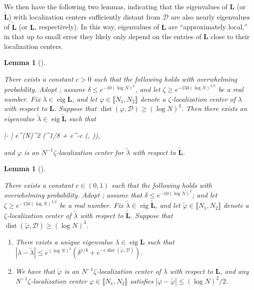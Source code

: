 \documentclass{amsart}
\numberwithin{equation}{section}
\DeclareMathOperator{\eig}{eig}
\DeclareMathOperator{\dist}{dist}
\newtheorem{lem}[thm]{Lemma}
\theoremstyle{remark}
\theoremstyle{definition}
\begin{document}
	We then have the following two lemmas, indicating that the eigenvalues of $\bm{L}$ (or $\tilde{\bm{L}}$) with localization centers sufficiently distant from $\mathcal{D}$ are also nearly eigenvalues of $\tilde{\bm{L}}$ (or $\bm{L}$, respectively). In this way, eigenvalues of $\bm{L}$ are ``approximately local,'' in that up to small error they likely only depend on the entries of $\bm{L}$ close to their localization centers.
	
	
	\begin{lem}[{\cite[Corollary 5.5]{LC}}]
		
		\label{lleigenvalues2} 
		
		
		There exists a constant $c>0$ such that the following holds with overwhelming probability. Adopt ; assume $\delta \le e^{-10(\log N)^2}$, and let $\zeta \ge e^{-150(\log N)^{3/2}}$ be a real number. Fix $\lambda \in \eig \bm{L}$, and let $\varphi \in \llbracket N_1, N_2 \rrbracket$ denote a $\zeta$-localization center of $\lambda$ with respect to $\bm{L}$. Suppose that $\dist (\varphi, \mathcal{D}) \ge (\log N)^3$. Then there exists an eigenvalue $\tilde{\lambda} \in \eig \tilde{\bm{L}}$ such that
		\begin{flalign*}
			|\lambda - \tilde{\lambda}| \le e^{(\log N)^2} (\delta^{1/8} + e^{-c \dist (\varphi, )}), 
		\end{flalign*}
		
		\noindent and $\varphi$ is an $N^{-1} \zeta$-localization center for $\tilde{\lambda}$ with respect to $\tilde{\bm{L}}$. 
		
	\end{lem}
	
	\begin{lem}[{\cite[Corollary 5.6]{LC}}]
		\label{lleigenvalues} 
		
		There exists a constant $c \in (0, 1)$ such that the following holds with overwhelming probability. Adopt ; assume that $\delta \le e^{-10(\log N)^2}$; and let $\zeta \ge e^{-150(\log N)^{3/2}}$ be a real number. Fix $\tilde{\lambda} \in \eig \tilde{\bm{L}}$, and let $\tilde{\varphi} \in \llbracket N_1, N_2 \rrbracket$ denote a $\zeta$-localization center of $\tilde{\lambda}$ with respect to $\tilde{\bm{L}}$. Suppose that $\dist (\tilde{\varphi}, \mathcal{D}) \ge (\log N)^3$.
		
		\begin{enumerate} 
			\item There exists a unique eigenvalue $\lambda \in \eig \bm{L}$ such that $|\lambda - \tilde{\lambda}| \le e^{(\log N)^2} (\delta^{1/8} + e^{-c \dist (\tilde{\varphi}, \mathcal{D})})$.
			\item We have that $\tilde{\varphi}$ is an $N^{-1} \zeta$-localization center of $\lambda$ with respect to $\bm{L}$, and any $N^{-1} \zeta$-localization center $\varphi \in \llbracket N_1, N_2 \rrbracket$ satisfies $|\varphi - \tilde{\varphi}| \le (\log N)^2 / 2$. 
		\end{enumerate} 
		
	\end{lem}
	
\end{document}
